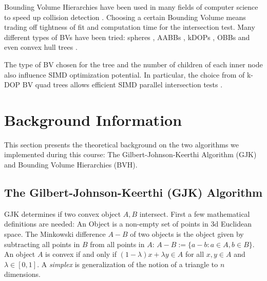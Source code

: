 \documentclass[twocolumn]{article}
\begin{document}
Bounding Volume Hierarchies have been used in many fields of computer science to speed up collision detection \cite{simdop}.
Choosing a certain Bounding Volume means trading off tightness of fit and computation time for the intersection test.
Many different types of BVs have been tried: spheres \cite{hubbard}, AABBs \cite{aabbtree}, kDOPs \cite{kDOPtree}, OBBs \cite{obbtree} and even convex hull trees \cite{convexhulltree}.

The type of BV chosen for the tree and the number of children of each inner node also influence SIMD optimization potential.
In particular, the choice from \cite{simdop} of k-DOP BV quad trees allows efficient SIMD parallel intersection tests \cite{simdop}.




\section{Background Information}\label{sec:background}

This section presents the theoretical background on the two algorithms we implemented during this course: The Gilbert-Johnson-Keerthi Algorithm (GJK) and Bounding Volume Hierarchies (BVH).

\subsection{The Gilbert-Johnson-Keerthi (GJK) Algorithm}
GJK determines if two convex object $A, B$ intersect. 
First a few mathematical definitions are needed:
An Object is a non-empty set of points in 3d Euclidean space. 
The Minkowski difference $A - B$ of two objects is the object given by subtracting all points in $B$ from all points in $A$: $A - B := \{a - b : a \in A, b \in B\}$. 
An object $A$ is convex if and only if $(1 - \lambda)x + \lambda y \in A$ for all $x, y \in A$ and $\lambda \in [0, 1]$. 
A \textit{simplex} is generalization of the notion of a triangle to $n$ dimensions.
\end{document}
